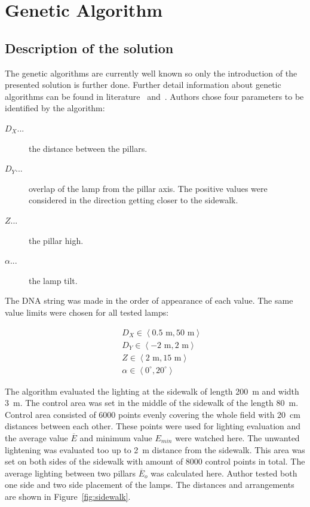 \section{Genetic Algorithm}
\subsection{Description of the solution}
The genetic algorithms are currently well known so only the introduction of the presented solution is further done. Further detail information about genetic algorithms can be found in literature~\cite{Zelinka2009} and~\cite{Fogel2006}. Authors chose four parameters to be identified by the algorithm:

\begin{description}
	\item [$D_X$...] the distance between the pillars.
	\item [$D_Y$...] overlap of the lamp from the pillar axis. The positive values were considered in the direction getting closer to the sidewalk.
	\item [$Z$...] the pillar high.
	\item [$\alpha$...] the lamp tilt.
\end{description}

The DNA string was made in the order of appearance of each value. The same value limits were chosen for all tested lamps:

\begin{eqnarray}
&&D_X \in \left\langle 0.5 \text{ m}, 50 \text{ m}\right\rangle \label{eq:DXLim}\\
&&D_Y \in \left\langle -2 \text{ m}, 2 \text{ m}\right\rangle \\
&&Z \in \left\langle 2 \text{ m}, 15 \text{ m}\right\rangle \\
&&\alpha \in \left\langle 0^\circ, 20^\circ \right\rangle
\end{eqnarray}

The algorithm evaluated the lighting at the sidewalk of length 200~m and width 3~m. The control area was set in the middle of the sidewalk of the length 80~m. Control area consisted of 6000 points evenly covering the whole field with 20~cm distances between each other. These points were used for lighting evaluation and the average value $\overline{E}$ and minimum value $E_{min}$ were watched here. The unwanted lightening was evaluated too up to 2~m distance from the sidewalk. This area was set on both sides of the sidewalk with amount of 8000 control points in total. The average lighting between two pillars $\overline{E}_o$ was calculated here. Author tested both one side and two side placement of the lamps. The distances and arrangements are shown in Figure~\ref{fig:sidewalk}.

